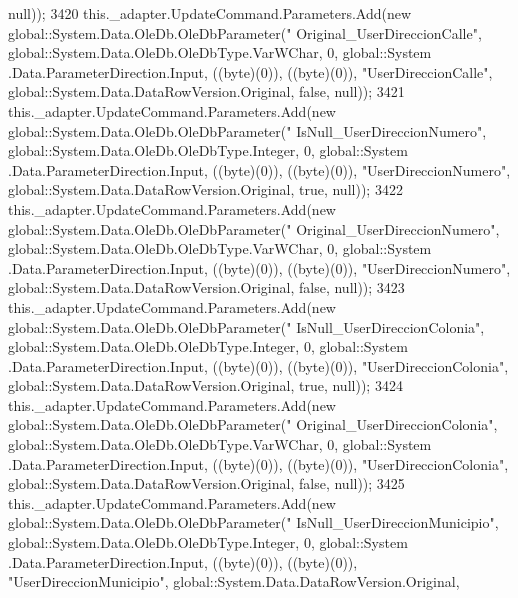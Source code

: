 \begin{DoxyCode}
      null));
3420             this.\_adapter.UpdateCommand.Parameters.Add(\textcolor{keyword}{new} global::System.Data.OleDb.OleDbParameter(\textcolor{stringliteral}{"
      Original\_UserDireccionCalle"}, global::System.Data.OleDb.OleDbType.VarWChar, 0, global::System
      .Data.ParameterDirection.Input, ((byte)(0)), ((byte)(0)), \textcolor{stringliteral}{"UserDireccionCalle"}, global::System.Data.DataRowVersion.Original, \textcolor{keyword}{
      false}, null));
3421             this.\_adapter.UpdateCommand.Parameters.Add(\textcolor{keyword}{new} global::System.Data.OleDb.OleDbParameter(\textcolor{stringliteral}{"
      IsNull\_UserDireccionNumero"}, global::System.Data.OleDb.OleDbType.Integer, 0, global::System
      .Data.ParameterDirection.Input, ((byte)(0)), ((byte)(0)), \textcolor{stringliteral}{"UserDireccionNumero"}, global::System.Data.DataRowVersion.Original, \textcolor{keyword}{true},
       null));
3422             this.\_adapter.UpdateCommand.Parameters.Add(\textcolor{keyword}{new} global::System.Data.OleDb.OleDbParameter(\textcolor{stringliteral}{"
      Original\_UserDireccionNumero"}, global::System.Data.OleDb.OleDbType.VarWChar, 0, global::System
      .Data.ParameterDirection.Input, ((byte)(0)), ((byte)(0)), \textcolor{stringliteral}{"UserDireccionNumero"}, global::System.Data.DataRowVersion.Original, \textcolor{keyword}{
      false}, null));
3423             this.\_adapter.UpdateCommand.Parameters.Add(\textcolor{keyword}{new} global::System.Data.OleDb.OleDbParameter(\textcolor{stringliteral}{"
      IsNull\_UserDireccionColonia"}, global::System.Data.OleDb.OleDbType.Integer, 0, global::System
      .Data.ParameterDirection.Input, ((byte)(0)), ((byte)(0)), \textcolor{stringliteral}{"UserDireccionColonia"}, global::System.Data.DataRowVersion.Original, \textcolor{keyword}{
      true}, null));
3424             this.\_adapter.UpdateCommand.Parameters.Add(\textcolor{keyword}{new} global::System.Data.OleDb.OleDbParameter(\textcolor{stringliteral}{"
      Original\_UserDireccionColonia"}, global::System.Data.OleDb.OleDbType.VarWChar, 0, global::System
      .Data.ParameterDirection.Input, ((byte)(0)), ((byte)(0)), \textcolor{stringliteral}{"UserDireccionColonia"}, global::System.Data.DataRowVersion.Original, \textcolor{keyword}{
      false}, null));
3425             this.\_adapter.UpdateCommand.Parameters.Add(\textcolor{keyword}{new} global::System.Data.OleDb.OleDbParameter(\textcolor{stringliteral}{"
      IsNull\_UserDireccionMunicipio"}, global::System.Data.OleDb.OleDbType.Integer, 0, global::System
      .Data.ParameterDirection.Input, ((byte)(0)), ((byte)(0)), \textcolor{stringliteral}{"UserDireccionMunicipio"}, global::System.Data.DataRowVersion.Original,

\end{DoxyCode}
